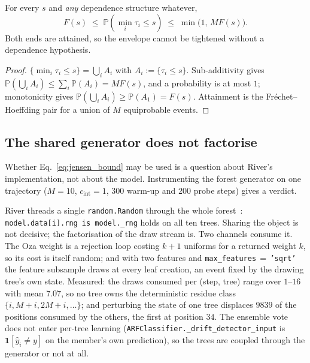\begin{proposition}\label{prop:min_boole}
  For every $s$ and \emph{any} dependence structure whatever,
  \begin{equation}\label{eq:boole_bound}
    F(s) \;\le\; \mathbb{P}\!\left(\min_i \tau_i \le s\right) \;\le\; \min\bigl(1,\, M F(s)\bigr).
  \end{equation}
  Both ends are attained, so the envelope cannot be tightened without a dependence hypothesis.
\end{proposition}

\begin{proof}
  $\{\min_i \tau_i \le s\} = \bigcup_i A_i$ with $A_i := \{\tau_i \le s\}$. Sub-additivity gives
  $\mathbb{P}(\bigcup_i A_i) \le \sum_i \mathbb{P}(A_i) = M F(s)$, and a probability is at most
  $1$; monotonicity gives $\mathbb{P}(\bigcup_i A_i) \ge \mathbb{P}(A_1) = F(s)$. Attainment is the
  Fr\'echet--Hoeffding pair for a union of $M$ equiprobable events.
\end{proof}

\subsection{The shared generator does not factorise}\label{sec:dep_gate}

Whether Eq.~\eqref{eq:jensen_bound} may be used is a question about River's implementation, not
about the model. Instrumenting the forest generator on one trajectory
($M = 10$, $c_{\mathrm{int}} = 1$, $300$ warm-up and $200$ probe steps) gives a verdict.

\begin{remark}\label{rem:rng_gate}
  River threads a single \texttt{random.Random} through the whole forest~\cite{montiel_river_2021}:
  \texttt{model.data[i].rng is model.\_rng} holds on all ten trees. Sharing the object is not
  decisive; the factorisation of the draw stream is. Two channels consume it. The Oza weight is a
  rejection loop costing $k+1$ uniforms for a returned weight $k$, so its cost is itself random;
  and with two features and \texttt{max\_features}$\,=\,$\texttt{'sqrt'} the feature subsample draws
  at every leaf creation, an event fixed by the drawing tree's own state. Measured: the draws
  consumed per (step, tree) range over $1$--$16$ with mean $7.07$, so no tree owns the deterministic
  residue class $\{i, M{+}i, 2M{+}i, \ldots\}$; and perturbing the state of one tree displaces
  $9839$ of the positions consumed by the others, the first at position $34$. The ensemble vote does
  not enter per-tree learning (\texttt{ARFClassifier.\_drift\_detector\_input} is
  $\mathbf{1}[\hat{y}_i \ne y]$ on the member's own prediction), so the trees are coupled through
  the generator or not at all.
\end{remark}

